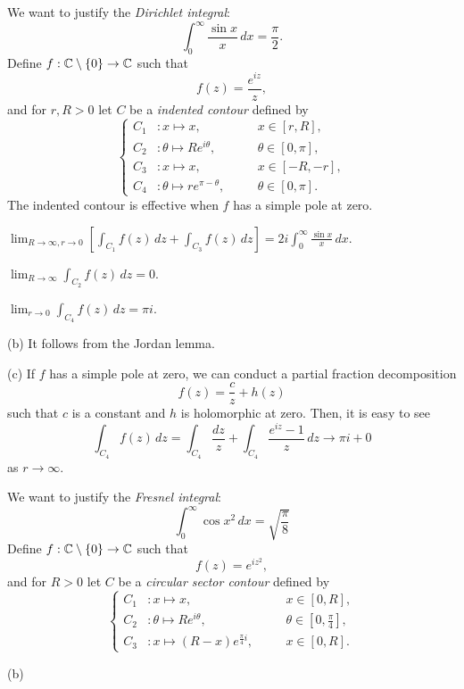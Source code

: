 \documentclass{../note}
\begin{document}
\begin{prb}
We want to justify the \emph{Dirichlet integral}:
\[\int_0^\infty\frac{\sin x}x\,dx=\frac\pi2.\]
Define $f:\mathbb{C}\setminus\{0\}\to\mathbb{C}$ such that
\[f(z)=\frac{e^{iz}}z,\]
and for $r,R>0$ let $C$ be a \emph{indented contour} defined by
\[\left\{
\begin{alignedat}{2}
C_1&:x\mapsto x,&\quad&x\in[r,R],\\
C_2&:\theta\mapsto Re^{i\theta},&&\theta\in[0,\pi],\\
C_3&:x\mapsto x,&&x\in[-R,-r],\\
C_4&:\theta\mapsto re^{\pi-\theta},&&\theta\in[0,\pi].
\end{alignedat}
\right.\]
The indented contour is effective when $f$ has a simple pole at zero.
\begin{parts}
\item $\lim_{R\to\infty,r\to0}[\int_{C_1}f(z)\,dz+\int_{C_3}f(z)\,dz]=2i\int_0^\infty\frac{\sin x}x\,dx$.
\item $\lim_{R\to\infty}\int_{C_2}f(z)\,dz=0$.
\item $\lim_{r\to0}\int_{C_4}f(z)\,dz=\pi i$.
\end{parts}
\end{prb}
\begin{pf}
(b)
It follows from the Jordan lemma.

(c)
If $f$ has a simple pole at zero, we can conduct a partial fraction decomposition
\[f(z)=\frac cz+h(z)\]
such that $c$ is a constant and $h$ is holomorphic at zero.
Then, it is easy to see
\[\int_{C_4}f(z)\,dz=\int_{C_4}\frac{dz}z+\int_{C_4}\frac{e^{iz}-1}z\,dz\to\pi i+0\]
as $r\to\infty$.
\end{pf}

\begin{prb}
We want to justify the \emph{Fresnel integral}:
\[\int_0^\infty\cos x^2\,dx=\sqrt{\frac\pi8}\]
Define $f:\mathbb{C}\setminus\{0\}\to\mathbb{C}$ such that
\[f(z)=e^{iz^2},\]
and for $R>0$ let $C$ be a \emph{circular sector contour} defined by
\[\left\{
\begin{alignedat}{2}
C_1&:x\mapsto x,&\quad&x\in[0,R],\\
C_2&:\theta\mapsto Re^{i\theta},&&\theta\in[0,\tfrac\pi4],\\
C_3&:x\mapsto(R-x)e^{\frac\pi4i},&&x\in[0,R].
\end{alignedat}
\right.\]
\begin{parts}
\item
\end{parts}
\end{prb}
\begin{pf}
(b)

\end{pf}
\end{document}
